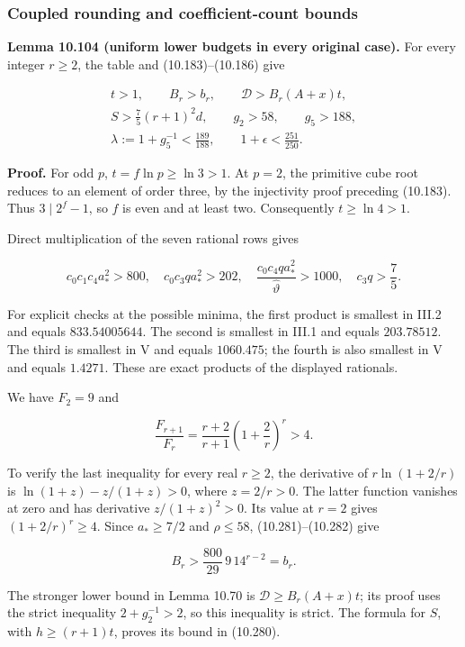 \documentclass[
  11pt,
  a4paper,
]{article}
\begin{document}
\subsubsection{Coupled rounding and coefficient-count
bounds}\label{coupled-rounding-and-coefficient-count-bounds}

\textbf{Lemma 10.104 (uniform lower budgets in every original case).}
For every integer \(r\ge2\), the table and (10.183)--(10.186) give

\[
\begin{gathered}
t>1,\qquad B_r>b_r,\qquad
\mathcal D>B_r(A+x)t,\\
S>\frac75(r+1)^2d,\qquad g_2>58,\qquad g_5>188,\\
\lambda:=1+g_5^{-1}<\frac{189}{188},\qquad
1+\epsilon<\frac{251}{250}.
\end{gathered}
\tag{10.280}
\]

\textbf{Proof.} For odd \(p\), \(t=f\ln p\ge\ln3>1\). At \(p=2\), the
primitive cube root reduces to an element of order three, by the
injectivity proof preceding (10.183). Thus \(3\mid2^f-1\), so \(f\) is
even and at least two. Consequently \(t\ge\ln4>1\).

Direct multiplication of the seven rational rows gives

\[
c_0c_1c_4a_*^2>800,\quad
c_0c_3qa_*^2>202,\quad
\frac{c_0c_4qa_*^2}{\widehat\vartheta}>1000,\quad
c_3q>\frac75.
\tag{10.281}
\]

For explicit checks at the possible minima, the first product is
smallest in III.2 and equals \(833.54005644\). The second is smallest in
III.1 and equals \(203.78512\). The third is smallest in V and equals
\(1060.475\); the fourth is also smallest in V and equals \(1.4271\).
These are exact products of the displayed rationals.

We have \(F_2=9\) and

\[
\frac{F_{r+1}}{F_r}
=\frac{r+2}{r+1}\left(1+\frac2r\right)^r>4.
\tag{10.282}
\]

To verify the last inequality for every real \(r\ge2\), the derivative
of \(r\ln(1+2/r)\) is \(\ln(1+z)-z/(1+z)>0\), where \(z=2/r>0\). The
latter function vanishes at zero and has derivative \(z/(1+z)^2>0\). Its
value at \(r=2\) gives \((1+2/r)^r\ge4\). Since \(a_*\ge7/2\) and
\(\rho\le58\), (10.281)--(10.282) give

\[
B_r>\frac{800}{29}\,9\,14^{r-2}=b_r.
\tag{10.283}
\]

The stronger lower bound in Lemma 10.70 is \(\mathcal D\ge B_r(A+x)t\);
its proof uses the strict inequality \(2+g_2^{-1}>2\), so this
inequality is strict. The formula for \(S\), with \(h\ge(r+1)t\), proves
its bound in (10.280).
\end{document}
